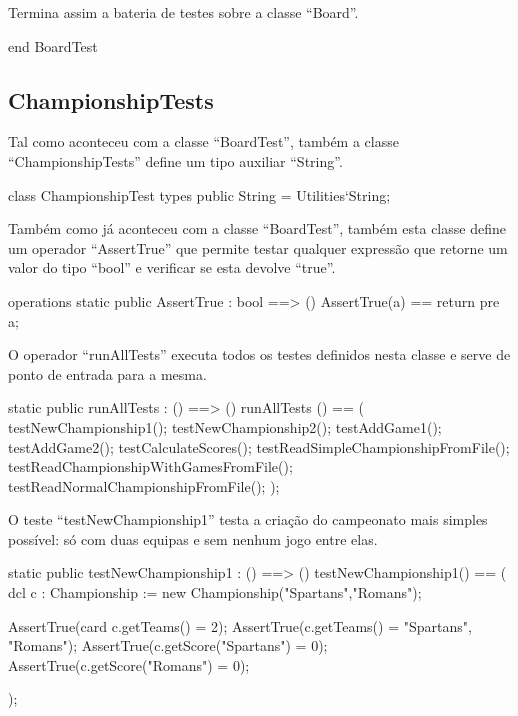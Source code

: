 Termina assim a bateria de testes sobre a classe ``Board''.
  
\begin{vdm_al}
  end BoardTest
\end{vdm_al}

\subsection{ChampionshipTests}

Tal como aconteceu com a classe ``BoardTest'', também a classe
``ChampionshipTests'' define um tipo auxiliar ``String''.

\begin{vdm_al}
  class ChampionshipTest
    types
      public String = Utilities`String;
\end{vdm_al}

Também como já aconteceu com a classe ``BoardTest'', também esta
classe define um operador ``AssertTrue'' que permite testar qualquer
expressão que retorne um valor do tipo ``bool'' e verificar se esta
devolve ``true''.

\begin{vdm_al}  
    operations
    static public AssertTrue : bool ==> ()
      AssertTrue(a) == return
    pre a;
\end{vdm_al}  

O operador ``runAllTests'' executa todos os testes definidos nesta
classe e serve de ponto de entrada para a mesma.

\begin{vdm_al}  
    static public runAllTests : () ==> ()
    runAllTests () == (
      testNewChampionship1();
      testNewChampionship2();
      testAddGame1();
      testAddGame2();
      testCalculateScores();
      testReadSimpleChampionshipFromFile();
      testReadChampionshipWithGamesFromFile();
      testReadNormalChampionshipFromFile();
    );
\end{vdm_al}  

O teste ``testNewChampionship1'' testa a criação do campeonato mais
simples possível: só com duas equipas e sem nenhum jogo entre elas.

\begin{vdm_al}  
    static public testNewChampionship1 : () ==> ()
    testNewChampionship1() ==
      ( dcl c : Championship := new Championship({"Spartans","Romans"});
  
        AssertTrue(card c.getTeams() = 2);
        AssertTrue(c.getTeams() = {"Spartans", "Romans"});
        AssertTrue(c.getScore("Spartans") = 0);
        AssertTrue(c.getScore("Romans") = 0);
  
      );
\end{vdm_al}  


